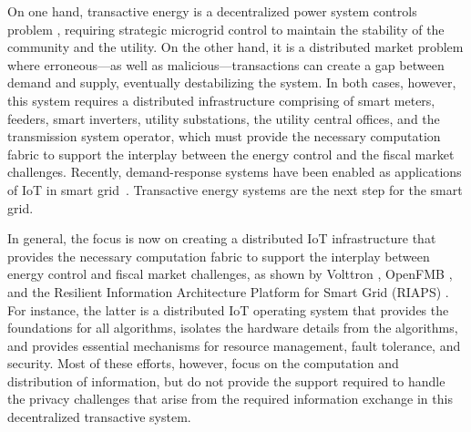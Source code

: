 On one hand, transactive energy is a decentralized power system
controls problem \cite{7452738}, requiring strategic microgrid control
to maintain the stability of the community and the utility. On the
other hand, it is a distributed market problem where erroneous---as
well as malicious---transactions can create a gap between demand and
supply, eventually destabilizing the system. In both cases, however,
this system requires a distributed infrastructure comprising of smart
meters, feeders, smart inverters, utility substations, the utility
central offices, and the transmission system operator, which must
provide the necessary computation fabric to support the interplay
between the energy control and the fiscal market challenges.
Recently, demand-response systems have been enabled as applications of
IoT in smart grid~\cite{Haider2016166}. Transactive energy systems are
the next step for the smart grid.

In general, the focus is now on creating a distributed IoT
infrastructure
that provides the necessary computation fabric to support the
interplay between energy control and fiscal market challenges, as
shown by Volttron \cite{katipamula2016volttron}, OpenFMB
\cite{gunthersmart}, and the Resilient Information Architecture
Platform for Smart Grid (RIAPS)
\cite{eisele2017riaps,Scott2017ICCPS}. For instance, the latter is a
distributed IoT operating system that provides the foundations for all
algorithms, isolates the hardware details from the algorithms, and
provides essential mechanisms for resource management, fault
tolerance, and security. Most of these efforts, however, focus on the
computation and distribution of information, but do not provide the
support required to handle the privacy challenges that arise from the
required information exchange in this decentralized transactive
system.

